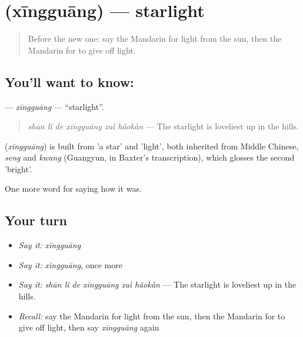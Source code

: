 \section[\texorpdfstring{\zh{星光} (xīngguāng)}{星光 (xīngguāng)}]{ (xīngguāng) — starlight}

\label{lesson:ZH-C517-xingguang}



\begin{quote}
Before the new one: say the Mandarin for light from the sun, then the Mandarin for to give off light.
\end{quote}

\subsection*{You'll want to know: }
\textbf{} — \emph{xīngguāng} — \textquotedblleft{}starlight\textquotedblright{}.

\begin{quote}
\textbf{} \emph{shān lǐ de xīngguāng zuì hǎokàn} — The starlight is loveliest up in the hills.
\end{quote}

\begin{cousinweb}
\textbf{} (\emph{xīngguāng}) is built from  'a star' and  'light', both inherited from Middle Chinese, \emph{seng} and \emph{kwang} (Guangyun, in Baxter's transcription), which glosses the second 'bright'.
\end{cousinweb}

\begin{grammarlens}[title={What you've built}]
One more word for saying how it was.
\end{grammarlens}

\subsection*{Your turn}
\begin{itemize}
\raggedright
  \item \emph{Say it:} \emph{xīngguāng}
  \item \emph{Say it:} \emph{xīngguāng}, once more
  \item \emph{Say it:} \emph{shān lǐ de xīngguāng zuì hǎokàn} — The starlight is loveliest up in the hills.
  \item \emph{Recall:} say the Mandarin for light from the sun, then the Mandarin for to give off light, then say \emph{xīngguāng} again
\end{itemize}

